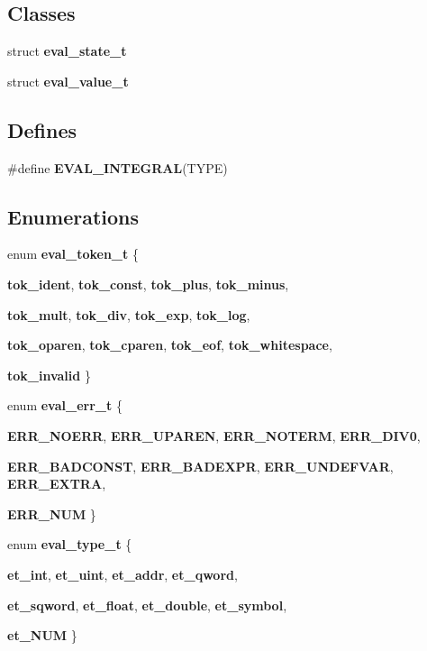 \subsection*{Classes}
\begin{CompactItemize}
\item 
struct {\bf eval\_\-state\_\-t}
\item 
struct {\bf eval\_\-value\_\-t}
\end{CompactItemize}
\subsection*{Defines}
\begin{CompactItemize}
\item 
\#define {\bf EVAL\_\-INTEGRAL}(TYPE)
\end{CompactItemize}
\subsection*{Enumerations}
\begin{CompactItemize}
\item 
enum {\bf eval\_\-token\_\-t} \{ \par
{\bf tok\_\-ident}, 
{\bf tok\_\-const}, 
{\bf tok\_\-plus}, 
{\bf tok\_\-minus}, 
\par
{\bf tok\_\-mult}, 
{\bf tok\_\-div}, 
{\bf tok\_\-exp}, 
{\bf tok\_\-log}, 
\par
{\bf tok\_\-oparen}, 
{\bf tok\_\-cparen}, 
{\bf tok\_\-eof}, 
{\bf tok\_\-whitespace}, 
\par
{\bf tok\_\-invalid}
 \}
\item 
enum {\bf eval\_\-err\_\-t} \{ \par
{\bf ERR\_\-NOERR}, 
{\bf ERR\_\-UPAREN}, 
{\bf ERR\_\-NOTERM}, 
{\bf ERR\_\-DIV0}, 
\par
{\bf ERR\_\-BADCONST}, 
{\bf ERR\_\-BADEXPR}, 
{\bf ERR\_\-UNDEFVAR}, 
{\bf ERR\_\-EXTRA}, 
\par
{\bf ERR\_\-NUM}
 \}
\item 
enum {\bf eval\_\-type\_\-t} \{ \par
{\bf et\_\-int}, 
{\bf et\_\-uint}, 
{\bf et\_\-addr}, 
{\bf et\_\-qword}, 
\par
{\bf et\_\-sqword}, 
{\bf et\_\-float}, 
{\bf et\_\-double}, 
{\bf et\_\-symbol}, 
\par
{\bf et\_\-NUM}
 \}
\end{CompactItemize}
